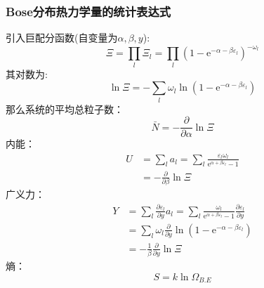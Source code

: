\documentclass[12pt]{article}
\begin{document}
\subsubsection{Bose分布热力学量的统计表达式}
\noindent
引入巨配分函数(自变量为$\alpha, \beta, y$):
\begin{equation}
	\Xi = \prod_l \Xi_l =\prod_l (1-\mathrm{e}^{-\alpha-\beta \varepsilon_l})^{-\omega_l}
\end{equation}
其对数为:
\begin{equation}
	\ln \Xi=-\sum_l \omega_l \ln (1-\mathrm{e}^{-\alpha-\beta \varepsilon_l}) 
\end{equation}
那么系统的平均总粒子数：
\begin{equation}
	\bar{N}=-\frac{\partial}{\partial \alpha}\ln \Xi
\end{equation}
内能：
\begin{equation}
	\begin{split}
		U&=\sum_l a_l=\sum_l \frac{\varepsilon_l \omega_l}{\mathrm{e}^{\alpha+\beta \varepsilon_l}-1}\\
		&=-\frac{\partial }{\partial \beta}\ln \Xi
	\end{split}
\end{equation}
广义力：
\begin{equation}
	\begin{split}
		Y&=\sum_l \frac{\partial \varepsilon_l}{\partial y} a_l=\sum_l \frac{\omega_l}{\mathrm{e}^{\alpha+\beta \varepsilon_l}-1}\frac{\partial \varepsilon_l}{\partial y}\\
		&=\sum_l\omega_l \frac{\partial}{\partial y}\ln (1-\mathrm{e}^{-\alpha-\beta \varepsilon_l}) \\
		&=-\frac{1}{\beta}\frac{\partial}{\partial y}\ln \Xi
	\end{split}
\end{equation}
熵：
\begin{equation}
	S=k\ln \Omega_{B.E}
\end{equation}
\end{document}
